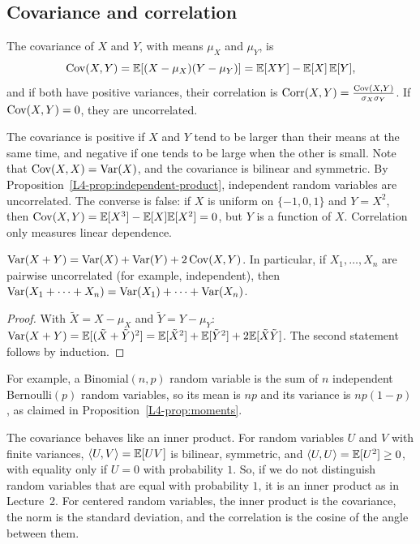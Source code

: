 \subsection{Covariance and correlation}

\begin{definition}\label{L4-def:covariance}
    The covariance of $X$ and $Y$, with means $\mu_X$ and $\mu_Y$, is
    \[\operatorname{Cov}(X, Y) = \mathbb{E}[(X - \mu_X)(Y - \mu_Y)] = \mathbb{E}[XY] - \mathbb{E}[X]\,\mathbb{E}[Y],\]
    and if both have positive variances, their correlation is $\operatorname{Corr}(X, Y) = \frac{\operatorname{Cov}(X, Y)}{\sigma_X\sigma_Y}$. If $\operatorname{Cov}(X, Y) = 0$, they are uncorrelated.
\end{definition}

The covariance is positive if $X$ and $Y$ tend to be larger than their means at the same time, and negative if one tends to be large when the other is small. Note that $\operatorname{Cov}(X, X) = \operatorname{Var}(X)$, and the covariance is bilinear and symmetric. By Proposition~\ref{L4-prop:independent-product}, independent random variables are uncorrelated. The converse is false: if $X$ is uniform on $\{-1, 0, 1\}$ and $Y = X^2$, then $\operatorname{Cov}(X, Y) = \mathbb{E}[X^3] - \mathbb{E}[X]\mathbb{E}[X^2] = 0$, but $Y$ is a function of $X$. Correlation only measures linear dependence.

\begin{proposition}\label{L4-prop:variance-sum}
    $\operatorname{Var}(X + Y) = \operatorname{Var}(X) + \operatorname{Var}(Y) + 2\operatorname{Cov}(X, Y)$. In particular, if $X_1, \ldots, X_n$ are pairwise uncorrelated (for example, independent), then $\operatorname{Var}(X_1 + \cdots + X_n) = \operatorname{Var}(X_1) + \cdots + \operatorname{Var}(X_n)$.
\end{proposition}

\begin{proof}
    With $\tilde X = X - \mu_X$ and $\tilde Y = Y - \mu_Y$: $\operatorname{Var}(X + Y) = \mathbb{E}[(\tilde X + \tilde Y)^2] = \mathbb{E}[\tilde X^2] + \mathbb{E}[\tilde Y^2] + 2\mathbb{E}[\tilde X\tilde Y]$. The second statement follows by induction.
\end{proof}

For example, a Binomial$(n, p)$ random variable is the sum of $n$ independent Bernoulli$(p)$ random variables, so its mean is $np$ and its variance is $np(1 - p)$, as claimed in Proposition~\ref{L4-prop:moments}.

The covariance behaves like an inner product. For random variables $U$ and $V$ with finite variances, $\langle U, V \rangle = \mathbb{E}[UV]$ is bilinear, symmetric, and $\langle U, U \rangle = \mathbb{E}[U^2] \geq 0$, with equality only if $U = 0$ with probability $1$. So, if we do not distinguish random variables that are equal with probability $1$, it is an inner product as in Lecture~2. For centered random variables, the inner product is the covariance, the norm is the standard deviation, and the correlation is the cosine of the angle between them.

